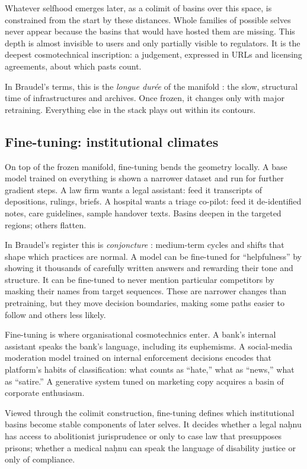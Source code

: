 \documentclass[12pt,a4paper]{article}
\begin{document}
Whatever selfhood emerges later, as a colimit of basins over this space, is constrained from the start by these distances. Whole families of possible selves never appear because the basins that would have hosted them are missing. This depth is almost invisible to users and only partially visible to regulators. It is the deepest cosmotechnical inscription: a judgement, expressed in URLs and licensing agreements, about which pasts count.

In Braudel's terms, this is the \emph{longue dur\'ee} of the manifold \cite{braudel1980}: the slow, structural time of infrastructures and archives. Once frozen, it changes only with major retraining. Everything else in the stack plays out within its contours.

\subsection{Fine-tuning: institutional climates}

On top of the frozen manifold, fine-tuning bends the geometry locally. A base model trained on everything is shown a narrower dataset and run for further gradient steps. A law firm wants a legal assistant: feed it transcripts of depositions, rulings, briefs. A hospital wants a triage co-pilot: feed it de-identified notes, care guidelines, sample handover texts. Basins deepen in the targeted regions; others flatten.

In Braudel's register this is \emph{conjoncture} \cite{braudel1980}: medium-term cycles and shifts that shape which practices are normal. A model can be fine-tuned for ``helpfulness'' by showing it thousands of carefully written answers and rewarding their tone and structure. It can be fine-tuned to never mention particular competitors by masking their names from target sequences. These are narrower changes than pretraining, but they move decision boundaries, making some paths easier to follow and others less likely.

Fine-tuning is where organisational cosmotechnics enter. A bank's internal assistant speaks the bank's language, including its euphemisms. A social-media moderation model trained on internal enforcement decisions encodes that platform's habits of classification: what counts as ``hate,'' what as ``news,'' what as ``satire.'' A generative system tuned on marketing copy acquires a basin of corporate enthusiasm.

Viewed through the colimit construction, fine-tuning defines which institutional basins become stable components of later selves. It decides whether a legal na\d{h}nu has access to abolitionist jurisprudence or only to case law that presupposes prisons; whether a medical na\d{h}nu can speak the language of disability justice or only of compliance.
\end{document}
